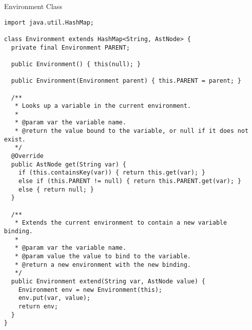 \begin{cl}{Environment Class}
\begin{lstlisting}[language=MyJava]
import java.util.HashMap;

class Environment extends HashMap<String, AstNode> {
  private final Environment PARENT;

  public Environment() { this(null); }

  public Environment(Environment parent) { this.PARENT = parent; }

  /**
   * Looks up a variable in the current environment.
   * 
   * @param var the variable name.
   * @return the value bound to the variable, or null if it does not exist.
   */
  @Override
  public AstNode get(String var) {
    if (this.containsKey(var)) { return this.get(var); }
    else if (this.PARENT != null) { return this.PARENT.get(var); }
    else { return null; }
  }

  /**
   * Extends the current environment to contain a new variable binding.
   * 
   * @param var the variable name.
   * @param value the value to bind to the variable.
   * @return a new environment with the new binding.
   */
  public Environment extend(String var, AstNode value) {
    Environment env = new Environment(this);
    env.put(var, value);
    return env;
  }
}
\end{lstlisting}
\end{cl}

